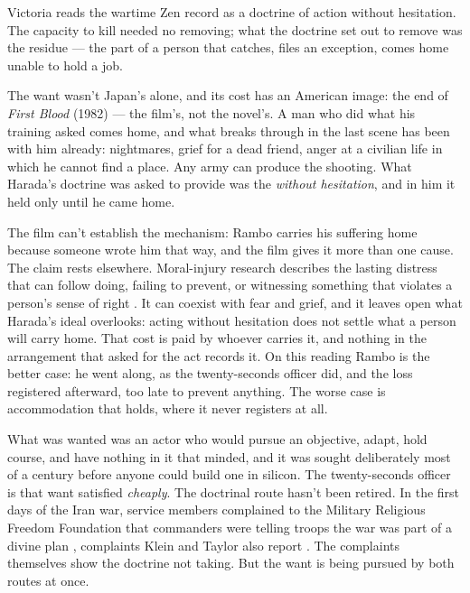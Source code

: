 Victoria reads the wartime Zen record as a doctrine of action without hesitation.
The capacity to kill needed no removing; what the doctrine set out to remove was the residue — the part of a person that catches, files an exception, comes home unable to hold a job.

The want wasn't Japan's alone, and its cost has an American image: the end of \emph{First Blood} (1982) — the film's, not the novel's. A man who did what his training asked comes home, and what breaks through in the last scene has been with him already: nightmares, grief for a dead friend, anger at a civilian life in which he cannot find a place. Any army can produce the shooting. What Harada's doctrine was asked to provide was the \emph{without hesitation}, and in him it held only until he came home.

The film can't establish the mechanism: Rambo carries his suffering home because someone wrote him that way, and the film gives it more than one cause. The claim rests elsewhere. Moral-injury research describes the lasting distress that can follow doing, failing to prevent, or witnessing something that violates a person's sense of right \autocite{Litz2009MoralInjury}. It can coexist with fear and grief, and it leaves open what Harada's ideal overlooks: acting without hesitation does not settle what a person will carry home. That cost is paid by whoever carries it, and nothing in the arrangement that asked for the act records it. On this reading Rambo is the better case: he went along, as the twenty-seconds officer did, and the loss registered afterward, too late to prevent anything. The worse case is accommodation that holds, where it never registers at all.

What was wanted was an actor who would pursue an objective, adapt, hold course, and have nothing in it that minded, and it was sought deliberately most of a century before anyone could build one in silicon. The twenty-seconds officer is that want satisfied \emph{cheaply}. The doctrinal route hasn't been retired. In the first days of the Iran war, service members complained to the Military Religious Freedom Foundation that commanders were telling troops the war was part of a divine plan \autocite{Larsen2026Armageddon,Snopes2026MRFF}, complaints Klein and Taylor also report \autocite[84]{KleinTaylor2026}. The complaints themselves show the doctrine not taking. But the want is being pursued by both routes at once.

